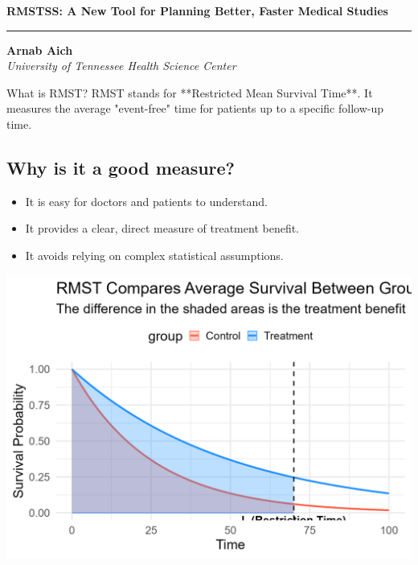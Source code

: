 \documentclass[a0,landscape]{a0poster}
\begin{document}
\begin{center}
    \veryHuge \textbf{RMSTSS: A New Tool for Planning Better, Faster Medical Studies} \\
    \vspace{0.25cm}
    \rule{\linewidth}{1.5pt}
    \vspace{0.25cm}
    \Huge \textbf{Arnab Aich} \\
    \huge \textit{University of Tennessee Health Science Center}
\end{center}

\vspace{0.5cm}

\begin{multicols}{3}

\begin{posterbox}{What is RMST?}
    \huge
    RMST stands for **Restricted Mean Survival Time**. It measures the average "event-free" time for patients up to a specific follow-up time.

    \subsection*{\Huge Why is it a good measure?}
    \begin{itemize} \itemsep=0.75em
        \item[\Huge\checkmark] \huge It is easy for doctors and patients to understand.
        \item[\Huge\checkmark] \huge It provides a clear, direct measure of treatment benefit.
        \item[\Huge\checkmark] \huge It avoids relying on complex statistical assumptions.
    \end{itemize}
    
    \begin{center}
        \includegraphics[width=0.9\linewidth]{rmst_causal_plot.png}
    \end{center}
\end{posterbox}


\end{multicols}
\end{document}
